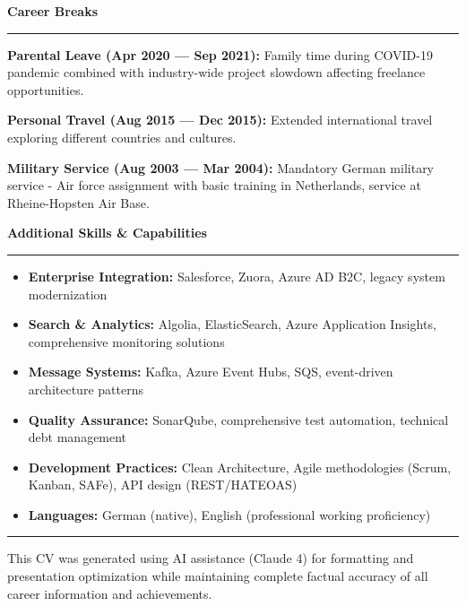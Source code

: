 \documentclass[11pt,a4paper]{article}
\newcommand{\sectiontitle}[1]{%
  \vspace{8pt}
  {\color{darkblue}\Large\bfseries #1}
  \vspace{4pt}
  \hrule
  \vspace{6pt}
}
\begin{document}
\vspace{8pt}

\sectiontitle{Career Breaks}

\textbf{Parental Leave (Apr 2020 --- Sep 2021):} Family time during COVID-19 pandemic combined with industry-wide project slowdown affecting freelance opportunities.

\textbf{Personal Travel (Aug 2015 --- Dec 2015):} Extended international travel exploring different countries and cultures.

\textbf{Military Service (Aug 2003 --- Mar 2004):} Mandatory German military service - Air force assignment with basic training in Netherlands, service at Rheine-Hopsten Air Base.

\vspace{8pt}

\sectiontitle{Additional Skills \& Capabilities}

\begin{itemize}
\item \textbf{Enterprise Integration:} Salesforce, Zuora, Azure AD B2C, legacy system modernization
\item \textbf{Search \& Analytics:} Algolia, ElasticSearch, Azure Application Insights, comprehensive monitoring solutions
\item \textbf{Message Systems:} Kafka, Azure Event Hubs, SQS, event-driven architecture patterns
\item \textbf{Quality Assurance:} SonarQube, comprehensive test automation, technical debt management
\item \textbf{Development Practices:} Clean Architecture, Agile methodologies (Scrum, Kanban, SAFe), API design (REST/HATEOAS)
\item \textbf{Languages:} German (native), English (professional working proficiency)
\end{itemize}

\vfill

\begin{center}
\vspace{8pt}
\hrule
\vspace{4pt}
{\footnotesize\color{lightgray} This CV was generated using AI assistance (Claude 4) for formatting and presentation optimization while maintaining complete factual accuracy of all career information and achievements.}
\end{center}
\end{document}
